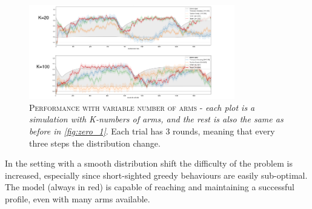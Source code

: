 \begin{figure}[h]
    \centering
    \includegraphics[width=0.8\textwidth]{figures/drawing2.png}
    \caption{\textsc{Performance with variable number of arms} - \textit{each plot is a simulation with K-numbers of arms, and the rest is also the same as before in \ref{fig:zero_1}}. Each trial has 3 rounds, meaning that every three steps the distribution change.}
    \label{fig:eps_1}
\end{figure}

\noindent In the setting with a smooth distribution shift the difficulty of the problem is increased, especially since short-sighted greedy behaviours are easily sub-optimal. The model (always in red) is capable of reaching and maintaining a successful profile, even with many arms available.

